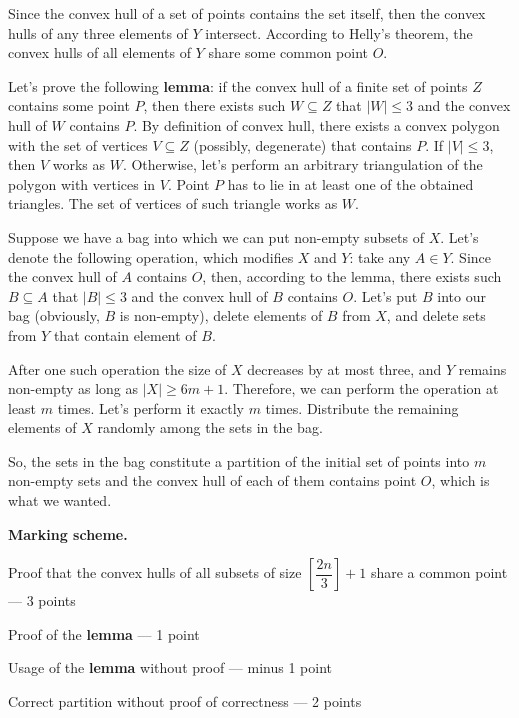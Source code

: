 \documentclass[12pt]{article}
\begin{document}
Since the convex hull of a set of points contains the set itself, then the convex hulls of any three elements of $Y$ intersect. According to Helly's theorem, the convex hulls of all elements of $Y$ share some common point $O$.

Let's prove the following \textbf{lemma}: if the convex hull of a finite set of points $Z$ contains some point $P$, then there exists such $W \subseteq Z$ that $|W| \leq 3$ and the convex hull of $W$ contains $P$. By definition of convex hull, there exists a convex polygon with the set of vertices $V \subseteq Z$ (possibly, degenerate) that contains $P$. If $|V| \leq 3$, then $V$ works as $W$. Otherwise, let's perform an arbitrary triangulation of the polygon with vertices in $V$. Point $P$ has to lie in at least one of the obtained triangles. The set of vertices of such triangle works as $W$.

Suppose we have a bag into which we can put non-empty subsets of $X$. Let's denote the following operation, which modifies $X$ and $Y$: take any $A \in Y$. Since the convex hull of $A$ contains $O$, then, according to the lemma, there exists such $B \subseteq A$ that $|B| \leq 3$ and the convex hull of $B$ contains $O$. Let's put $B$ into our bag (obviously, $B$ is non-empty), delete elements of $B$ from $X$, and delete sets from $Y$ that contain element of $B$. 

After one such operation the size of $X$ decreases by at most three, and $Y$ remains non-empty as long as $|X| \geq 6m + 1$. Therefore, we can perform the operation at least $m$ times. Let's perform it exactly $m$ times. Distribute the remaining elements of $X$ randomly among the sets in the bag. 

So, the sets in the bag constitute a partition of the initial set of points into $m$ non-empty sets and the convex hull of each of them contains point $O$, which is what we wanted.

\bigskip

\textbf{Marking scheme.}
\begin{compactitem}
\item Proof that the convex hulls of all subsets of size $\left[\dfrac{2n}{3}\right] + 1$ share a common point --- 3 points
\item Proof of the \textbf{lemma} --- 1 point
\item Usage of the \textbf{lemma} without proof --- minus 1 point
\item Correct partition without proof of correctness --- 2 points
\end{compactitem}
\end{document}
